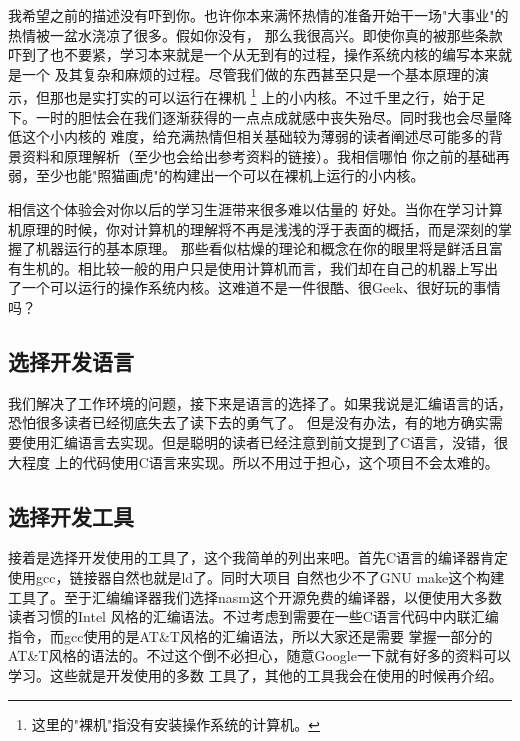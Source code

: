 \par 我希望之前的描述没有吓到你。也许你本来满怀热情的准备开始干一场"大事业"的热情被一盆水浇凉了很多。假如你没有，\allowbreak
那么我很高兴。即使你真的被那些条款吓到了也不要紧，学习本来就是一个从无到有的过程，操作系统内核的编写本来就是一个\allowbreak
及其复杂和麻烦的过程。尽管我们做的东西甚至只是一个基本原理的演示，但那也是实打实的可以运行在裸机\allowbreak
\footnote{这里的"裸机"指没有安装操作系统的计算机。}
上的小内核。不过千里之行，始于足下。一时的胆怯会在我们逐渐获得的一点点成就感中丧失殆尽。同时我也会尽量降低这个小内核的\allowbreak
难度，给充满热情但相关基础较为薄弱的读者阐述尽可能多的背景资料和原理解析（至少也会给出参考资料的链接）。我相信哪怕\allowbreak
你之前的基础再弱，至少也能"照猫画虎"的构建出一个可以在裸机上运行的小内核。

\par 相信这个体验会对你以后的学习生涯带来很多难以估量的\allowbreak
好处。当你在学习计算机原理的时候，你对计算机的理解将不再是浅浅的浮于表面的概括，而是深刻的掌握了机器运行的基本原理。\allowbreak
那些看似枯燥的理论和概念在你的眼里将是鲜活且富有生机的。相比较一般的用户只是使用计算机而言，我们却在自己的机器上写出\allowbreak
了一个可以运行的操作系统内核。这难道不是一件很酷、很Geek、很好玩的事情吗？

\subsection{选择开发语言}
\par 我们解决了工作环境的问题，接下来是语言的选择了。如果我说是汇编语言的话，恐怕很多读者已经彻底失去了读下去的勇气了。\allowbreak
但是没有办法，有的地方确实需要使用汇编语言去实现。但是聪明的读者已经注意到前文提到了C语言，没错，很大程度\allowbreak
上的代码使用C语言来实现。所以不用过于担心，这个项目不会太难的。

\subsection{选择开发工具}
\par 接着是选择开发使用的工具了，这个我简单的列出来吧。首先C语言的编译器肯定使用gcc，链接器自然也就是ld了。同时大项目\allowbreak
自然也少不了GNU make这个构建工具了。至于汇编编译器我们选择nasm这个开源免费的编译器，以便使用大多数读者习惯的Intel\allowbreak
风格的汇编语法。不过考虑到需要在一些C语言代码中内联汇编指令，而gcc使用的是AT\&T风格的汇编语法，所以大家还是需要\allowbreak
掌握一部分的AT\&T风格的语法的。不过这个倒不必担心，随意Google一下就有好多的资料可以学习。这些就是开发使用的多数\allowbreak
工具了，其他的工具我会在使用的时候再介绍。

